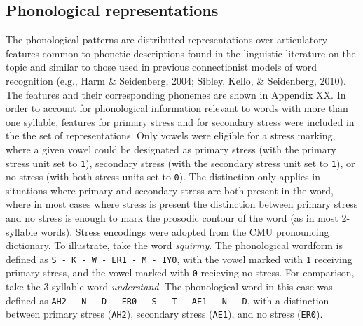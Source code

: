 \documentclass[
  american,
  man,floatsintext]{apa6}
\begin{document}
\hypertarget{phonological-representations}{%
\subsection{Phonological representations}\label{phonological-representations}}

The phonological patterns are distributed representations over articulatory features common to phonetic descriptions found in the linguistic literature on the topic and similar to those used in previous connectionist models of word recognition (e.g., Harm \& Seidenberg, 2004; Sibley, Kello, \& Seidenberg, 2010). The features and their corresponding phonemes are shown in Appendix XX. In order to account for phonological information relevant to words with more than one syllable, features for primary stress and for secondary stress were included in the the set of representations. Only vowels were eligible for a stress marking, where a given vowel could be designated as primary stress (with the primary stress unit set to \texttt{1}), secondary stress (with the secondary stress unit set to \texttt{1}), or no stress (with both stress units set to \texttt{0}). The distinction only applies in situations where primary and secondary stress are both present in the word, where in most cases where stress is present the distinction between primary stress and no stress is enough to mark the prosodic contour of the word (as in most 2-syllable words). Stress encodings were adopted from the CMU pronouncing dictionary. To illustrate, take the word \emph{squirmy}. The phonological wordform is defined as \texttt{S\ -\ K\ -\ W\ -\ ER1\ -\ M\ -\ IY0}, with the vowel marked with \texttt{1} receiving primary stress, and the vowel marked with \texttt{0} recieving no stress. For comparison, take the 3-syllable word \emph{understand}. The phonological word in this case was defined as \texttt{AH2\ -\ N\ -\ D\ -\ ER0\ -\ S\ -\ T\ -\ AE1\ -\ N\ -\ D}, with a distinction between primary stress (\texttt{AH2}), secondary stress (\texttt{AE1}), and no stress (\texttt{ER0}).
\end{document}

